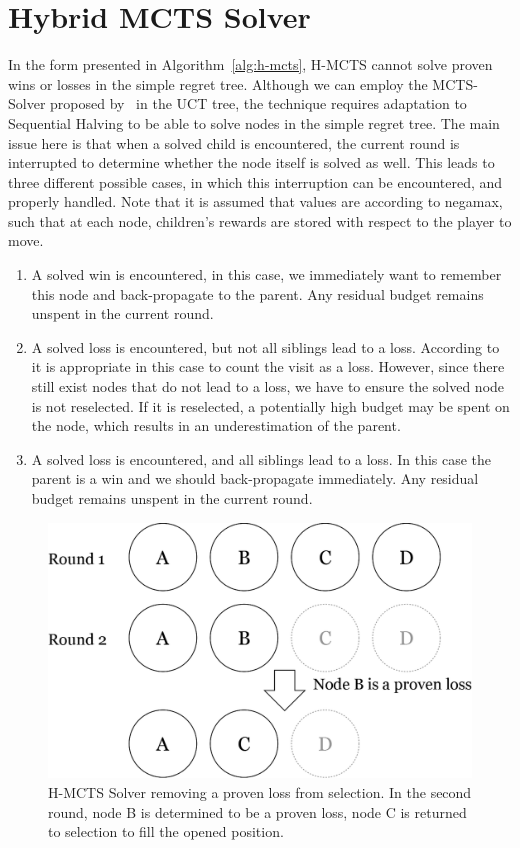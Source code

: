 \documentclass{icga}
\begin{document}
\section{Hybrid MCTS Solver}
\label{sec:hybmctssolver}

In the form presented in Algorithm~\ref{alg:h-mcts}, H-MCTS cannot solve proven wins or losses in the simple regret tree. Although we can employ the MCTS-Solver proposed by~ in the UCT tree, the technique requires adaptation to Sequential Halving to be able to solve nodes in the simple regret tree. The main issue here is that when a solved child is encountered, the current round is interrupted to determine whether the node itself is solved as well. This leads to three different possible cases, in which this interruption can be encountered, and properly handled. Note that it is assumed that values are according to negamax, such that at each node, children's rewards are stored with respect to the player to move.
\begin{enumerate}
\item A solved win is encountered, in this case, we immediately want to remember this node and back-propagate to the parent. Any residual budget remains unspent in the current round.
\item A solved loss is encountered, but not all siblings lead to a loss. According to~ it is appropriate in this case to count the visit as a loss. However, since there still exist nodes that do not lead to a loss, we have to ensure the solved node is not reselected. If it is reselected, a potentially high budget may be spent on the node, which results in an underestimation of the parent.
\item A solved loss is encountered, and all siblings lead to a loss. In this case the parent is a win and we should back-propagate immediately. Any residual budget remains unspent in the current round.
\end{enumerate}
\begin{figure}[hb]
	\centering
	\includegraphics[width=.6\textwidth]{img/solver.png}
	\caption[H-MCTS Solver example]{H-MCTS Solver removing a proven loss from selection. In the second round, node B is determined to be a proven loss, node C is returned to selection to fill the opened position.}
	\label{fig:h-mcts_solver}
\end{figure}
\end{document}
